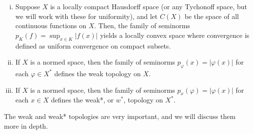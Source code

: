 \documentclass[10pt]{mypackage}
\begin{document}
\begin{example}\hfill
  \begin{enumerate}[(i)]
    \item Suppose $X$ is a locally compact Hausdorff space (or any Tychonoff space, but we will work with these for uniformity), and let $C(X)$ be the space of all continuous functions on $X$. Then, the family of seminorms $ p_K\left( f \right) = \sup_{x\in K} \left\vert f(x) \right\vert $ yields a locally convex space where convergence is defined as uniform convergence on compact subsets.
    \item If $X$ is a normed space, then the family of seminorms $p_{\varphi}\left( x \right) = \left\vert \varphi(x) \right\vert$ for each $\varphi\in X^{\ast}$ defines the weak topology on $X$.
    \item If $X$ is a normed space, then the family of seminorms $p_x(\varphi) = \left\vert \varphi(x) \right\vert$ for each $x\in X$ defines the weak*, or $w^{\ast}$, topology on $X^{\ast}$.
  \end{enumerate}
  The weak and weak* topologies are very important, and we will discuss them more in depth.
\end{example}
\end{document}
